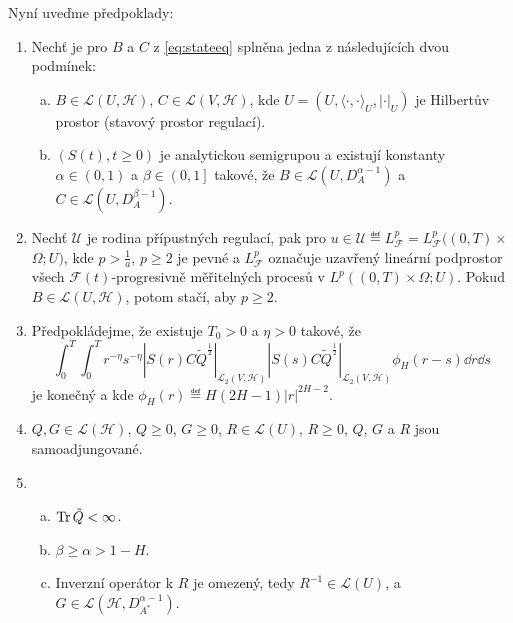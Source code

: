     Nyní uveďme předpoklady:
    \begin{enumerate}[({A}1)]
        \item Nechť je pro $B$ a $C$ z \eqref{eq:stateeq} splněna jedna z
            následujících dvou podmínek:
            \begin{enumerate}[(a)]
                \item $B\in\mathscr{L}\left( U,\mathscr{H} \right)$,
                    $C\in\mathscr{L}\left( V,\mathscr{H} \right)$, kde
                    $U = \left( U,\langle \cdot,\cdot \rangle_U,|\cdot|_U
                    \right)$ je Hilbertův prostor (stavový prostor
                    regulací).
                \item $\left(S(t),t\geq0\right)$ je analytickou semigrupou a
                    existují konstanty $\alpha\in\left( 0,1 \right)$ a
                $\beta\in\left( 0,1 \right]$ takové, že
                $B\in\mathscr{L}\left(U, D_A^{\alpha-1} \right)$ a
                $C\in\mathscr{L}\left(U, D_A^{\beta-1} \right)$.
            \end{enumerate}
        \item Nechť $\mathscr{U}$ je rodina přípustných regulací, pak pro
            $u\in\mathscr{U} \eqdef L_\mathscr{F}^p=L_\mathscr{F}^p( (
            0,T )\times$\\$\Omega;U )$, kde $p > \frac{1}{a}$,
            $p\geq2$ je pevné a $L_\mathscr{F}^p$ označuje uzavřený lineární
            podprostor všech $\mathscr{F}(t)$-progresivně měřitelných procesů v
            $L^p \left( \left( 0,T \right)\times \Omega;U \right)$. Pokud
            $B\in\mathscr{L}\left( U,\mathscr{H} \right)$, potom stačí, aby
            $p\geq2$.
        \item Předpokládejme, že existuje $T_0>0$ a $\eta>0$ takové, že
            $$ \int_0^T \int_0^T r^{-\eta}s^{-\eta}
            |S(r)C\tilde{Q}^{\frac{1}{2}}|_{\mathscr{L}_2\left(
            V,\mathscr{H} \right)}|S(s)C\tilde{Q}^{\frac{1}{2}}|_{\mathscr{L}_2\left(
            V,\mathscr{H} \right)} \phi_H(r-s)\dd r\!\dd s$$
            je konečný a kde $\phi_H(r)\eqdef H\left( 2H-1 \right)|r|^{2H-2}$.
        \item $Q,G\in\mathscr{L}(\mathscr{H})$, $Q\geq0$, $G\geq0$,
            $R\in\mathscr{L}(U)$, $R\geq0$, $Q$, $G$ a $R$ jsou
            samoadjungované.
        \item 
            \begin{enumerate}[(a)]
                \item $\operatorname{Tr}\tilde{Q}<\infty$.
                \item $\beta\geq\alpha>1-H$.
                \item Inverzní operátor k $R$ je omezený, tedy
                    $R^{-1}\in\mathscr{L}(U)$, a
                    $G\in\mathscr{L}(\mathscr{H},D_{A^*}^{\alpha-1})$.
            \end{enumerate}
    \end{enumerate}


